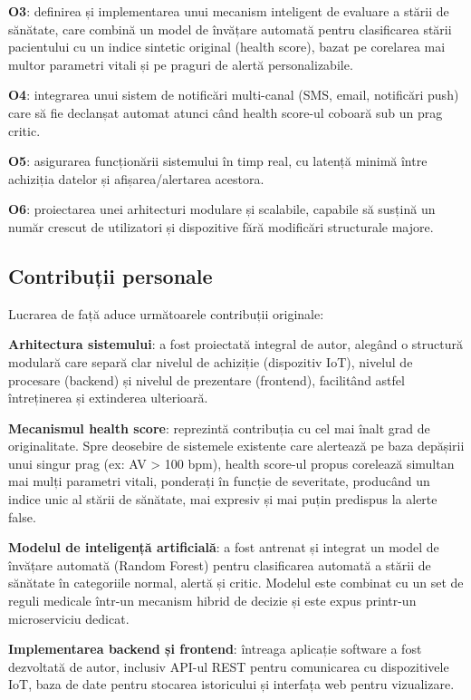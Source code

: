 \documentclass[12pt,a4paper]{article}
\begin{document}
\textbf{O3}: definirea și implementarea unui mecanism inteligent de evaluare a stării de sănătate, care combină un model de învățare automată pentru clasificarea stării pacientului cu un indice sintetic original (health score), bazat pe corelarea mai multor parametri vitali și pe praguri de alertă personalizabile.

\textbf{O4}: integrarea unui sistem de notificări multi-canal (SMS, email, notificări push) care să fie declanșat automat atunci când health score-ul coboară sub un prag critic.

\textbf{O5}: asigurarea funcționării sistemului în timp real, cu latență minimă între achiziția datelor și afișarea/alertarea acestora.

\textbf{O6}: proiectarea unei arhitecturi modulare și scalabile, capabile să susțină un număr crescut de utilizatori și dispozitive fără modificări structurale majore.

\subsection{Contribuții personale}

Lucrarea de față aduce următoarele contribuții originale:

\textbf{Arhitectura sistemului}: a fost proiectată integral de autor, alegând o structură modulară care separă clar nivelul de achiziție (dispozitiv IoT), nivelul de procesare (backend) și nivelul de prezentare (frontend), facilitând astfel întreținerea și extinderea ulterioară.

\textbf{Mecanismul health score}: reprezintă contribuția cu cel mai înalt grad de originalitate. Spre deosebire de sistemele existente care alertează pe baza depășirii unui singur prag (ex: AV > 100 bpm), health score-ul propus corelează simultan mai mulți parametri vitali, ponderați în funcție de severitate, producând un indice unic al stării de sănătate, mai expresiv și mai puțin predispus la alerte false.

\textbf{Modelul de inteligență artificială}: a fost antrenat și integrat un model de învățare automată (Random Forest) pentru clasificarea automată a stării de sănătate în categoriile normal, alertă și critic. Modelul este combinat cu un set de reguli medicale într-un mecanism hibrid de decizie și este expus printr-un microserviciu dedicat.

\textbf{Implementarea backend și frontend}: întreaga aplicație software a fost dezvoltată de autor, inclusiv API-ul REST pentru comunicarea cu dispozitivele IoT, baza de date pentru stocarea istoricului și interfața web pentru vizualizare.
\end{document}

